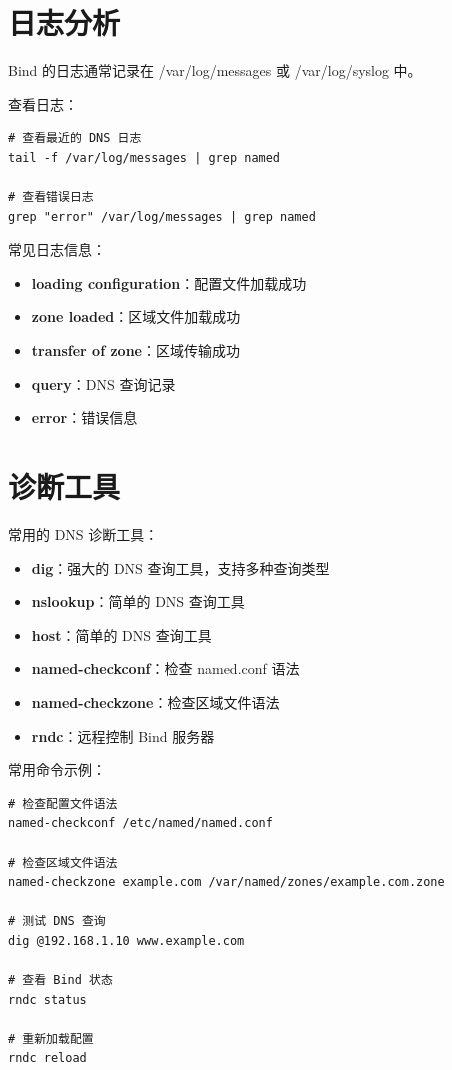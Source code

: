 \documentclass[12pt,UTF8]{ctexbook}
\begin{document}
\section{日志分析}
\label{sec:log_analysis}

Bind 的日志通常记录在 /var/log/messages 或 /var/log/syslog 中。

查看日志：
\begin{verbatim}
# 查看最近的 DNS 日志
tail -f /var/log/messages | grep named

# 查看错误日志
grep "error" /var/log/messages | grep named
\end{verbatim}

常见日志信息：
\begin{itemize}
    \item \textbf{loading configuration}：配置文件加载成功
    \item \textbf{zone loaded}：区域文件加载成功
    \item \textbf{transfer of zone}：区域传输成功
    \item \textbf{query}：DNS 查询记录
    \item \textbf{error}：错误信息
\end{itemize}

\section{诊断工具}
\label{sec:diagnostic_tools}

常用的 DNS 诊断工具：

\begin{itemize}
    \item \textbf{dig}：强大的 DNS 查询工具，支持多种查询类型
    \item \textbf{nslookup}：简单的 DNS 查询工具
    \item \textbf{host}：简单的 DNS 查询工具
    \item \textbf{named-checkconf}：检查 named.conf 语法
    \item \textbf{named-checkzone}：检查区域文件语法
    \item \textbf{rndc}：远程控制 Bind 服务器
\end{itemize}

常用命令示例：
\begin{verbatim}
# 检查配置文件语法
named-checkconf /etc/named/named.conf

# 检查区域文件语法
named-checkzone example.com /var/named/zones/example.com.zone

# 测试 DNS 查询
dig @192.168.1.10 www.example.com

# 查看 Bind 状态
rndc status

# 重新加载配置
rndc reload
\end{verbatim}
\end{document}
